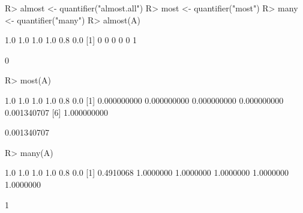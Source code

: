 \begin{Schunk}
% --begin: "quant5"
\begin{Sinput}
R> almost <- quantifier("almost.all")
R> most <- quantifier("most")
R> many <- quantifier("many")
R> almost(A)
\end{Sinput}
\begin{Soutput}
[1] 1.0 1.0 1.0 1.0 0.8 0.0
[1] 0 0 0 0 0 1
\end{Soutput}
\begin{Soutput}
[1] 0
\end{Soutput}
\begin{Sinput}
R> most(A)
\end{Sinput}
\begin{Soutput}
[1] 1.0 1.0 1.0 1.0 0.8 0.0
[1] 0.000000000 0.000000000 0.000000000 0.000000000 0.001340707
[6] 1.000000000
\end{Soutput}
\begin{Soutput}
[1] 0.001340707
\end{Soutput}
\begin{Sinput}
R> many(A)
\end{Sinput}
\begin{Soutput}
[1] 1.0 1.0 1.0 1.0 0.8 0.0
[1] 0.4910068 1.0000000 1.0000000 1.0000000 1.0000000 1.0000000
\end{Soutput}
\begin{Soutput}
[1] 1
\end{Soutput}
%
% --end: "quant5"
\end{Schunk}
